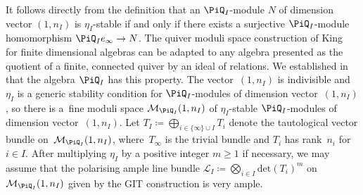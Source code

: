 It follows directly from the definition that an $\PiQ_I$-module $N$ of dimension vector $(1,n_I)$ is $\eta_I$-stable if and only if
there exists a surjective $\PiQ_I$-module homomorphism $\PiQ_I e_{\infty} \to N$.
The quiver moduli space construction of King~\cite[Proposition~5.3]{king1994moduli} for finite dimensional algebras can be adapted to any algebra presented as the quotient of a finite, connected quiver by an ideal of relations. We established in \cite[Proposition~3.3]{craw2019punctual} that the algebra $\PiQ_I$ has this property.
The vector~$(1,n_I)$ is indivisible and $\eta_I$ is a generic stability condition for $\PiQ_I$-modules of dimension vector~$(1,n_I)$, so there is a~fine moduli space $\mathcal{M}_{\PiQ_I}(1,n_I)$
of $\eta_I$-stable $\PiQ_I$-modules of dimension
vector~$(1,n_I)$. Let $T_I \coloneqq\bigoplus_{i \in \{\infty \}\cup I } T_i$ denote the tautological vector bundle on~$\mathcal{M}_{\PiQ_I}(1,n_I)$, where~$T_{\infty}$ is the trivial bundle and $T_i$ has rank~$n_i$ for $i \in I$.
After multiplying $\eta_I$ by a positive integer $m\geq 1$ if necessary, we may assume that the polarising ample line bundle $\mathcal{L}_I \coloneqq \bigotimes_{i \in I} \mathrm{det}(T_i)^{m}$ on $\mathcal{M}_{\PiQ_I}(1,n_I)$ given by the GIT construction is very ample.

